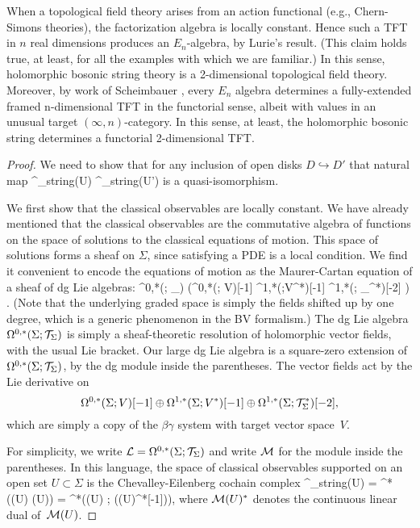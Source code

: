 \begin{rmk}
When a topological field theory arises from an action functional (e.g., Chern-Simons theories),
the factorization algebra is locally constant.
Hence such a TFT in $n$ real dimensions produces an $E_n$-algebra, by Lurie's result. 
(This claim holds true, at least, for all the examples with which we are familiar.)
In this sense, holomorphic bosonic string theory is a 2-dimensional topological field theory. 
Moreover, by work of Scheimbauer \cite{Scheim},
every $E_n$ algebra determines a fully-extended framed n-dimensional TFT in the functorial sense, albeit with values in an unusual target $(\infty,n)$-category.
In this sense, at least, the holomorphic bosonic string determines a functorial 2-dimensional TFT.
\end{rmk}

\begin{proof} 
We need to show that for any inclusion of open disks $D \hookrightarrow D'$ that natural map
\ben
\Obs^\q_{\rm string}(U) \to \Obs^\q_{\rm string}(U')
\een
is a quasi-isomorphism. 

We first show that the classical observables are locally constant. 
We have already mentioned that the classical observables are the commutative algebra of functions on the space of solutions to the classical equations of motion. 
This space of solutions forms a sheaf on $\Sigma$, 
since satisfying a PDE is a local condition.
We find it convenient to encode the equations of motion as the Maurer-Cartan equation of a sheaf  of dg Lie algebras:
\ben
\Omega^{0,*}(\Sigma ; \cT_\Sigma) \ltimes \left(\Omega^{0,*}(\Sigma; V)[-1] \oplus \Omega^{1,*}(\Sigma;V^*)[-1] \oplus \Omega^{1,*}(\Sigma ; \cT_\Sigma^*)[-2] \right) . 
\een
(Note that the underlying graded space is simply the fields shifted up by one degree,
which is a generic phenomenon in the BV formalism.)
The dg Lie algebra $\Omega^{0,*}(\Sigma ; \mathcal T_\Sigma)$ is simply a sheaf-theoretic resolution of holomorphic vector fields, with the usual Lie bracket.
Our large dg Lie algebra is a square-zero extension of $\Omega^{0,*}(\Sigma ; \mathcal T_\Sigma)$, 
by the dg module inside the parentheses.
The vector fields act by the Lie derivative on 
\[
\Omega^{0,*}(\Sigma; V)[-1] \oplus \Omega^{1,*}(\Sigma;V^*)[-1] \oplus \Omega^{1,*}(\Sigma ; \mathcal T_\Sigma^*)[-2],
\]
which are simply a copy of the $\beta\gamma$ system with target vector space~$V$.
 
For simplicity, we write $\mathcal L = \Omega^{0,*}(\Sigma ; \mathcal T_\Sigma)$ and write $\mathcal M$ for the module inside the parentheses.
In this language, the space of classical observables supported on an open set $U \subset \Sigma$ is the Chevalley-Eilenberg cochain complex
\ben
\Obs^{\cl}_{\rm string}(U) = \clie^*\left(\cL(U) \ltimes \cM(U)\right) = \clie^*\left(\cL(U) ; \; \Sym(\cM(U)^*[-1])\right),
\een
where $\mathcal M(U)^*$ denotes the continuous linear dual of~$\mathcal M(U)$. 


\end{proof}
